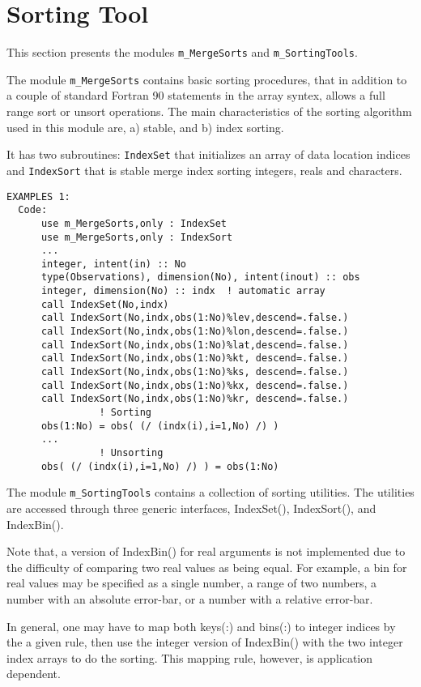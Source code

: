 \section{Sorting Tool}
%
This section presents the modules {\tt m\_MergeSorts} and
{\tt m\_SortingTools}.

\noindent
The module {\tt m\_MergeSorts} contains basic sorting procedures, that in
addition to a couple of standard Fortran 90 statements in the
array syntex, allows a full range sort or unsort operations.
The main characteristics of the sorting algorithm used in this
module are, a) stable, and b) index sorting.

It has two subroutines: {\tt IndexSet} that initializes an array of data
location indices and {\tt IndexSort} that is stable merge index sorting
integers, reals and characters.
%
\begin{verbatim}
EXAMPLES 1:
  Code:
      use m_MergeSorts,only : IndexSet
      use m_MergeSorts,only : IndexSort
      ...
      integer, intent(in) :: No
      type(Observations), dimension(No), intent(inout) :: obs
      integer, dimension(No) :: indx  ! automatic array
      call IndexSet(No,indx)
      call IndexSort(No,indx,obs(1:No)%lev,descend=.false.)
      call IndexSort(No,indx,obs(1:No)%lon,descend=.false.)
      call IndexSort(No,indx,obs(1:No)%lat,descend=.false.)
      call IndexSort(No,indx,obs(1:No)%kt, descend=.false.)
      call IndexSort(No,indx,obs(1:No)%ks, descend=.false.)
      call IndexSort(No,indx,obs(1:No)%kx, descend=.false.)
      call IndexSort(No,indx,obs(1:No)%kr, descend=.false.)
                ! Sorting
      obs(1:No) = obs( (/ (indx(i),i=1,No) /) )
      ...
                ! Unsorting
      obs( (/ (indx(i),i=1,No) /) ) = obs(1:No)
\end{verbatim}
 
\noindent
The module {\tt m\_SortingTools} contains a collection of sorting utilities.  
The utilities are accessed through three generic interfaces, IndexSet(),
IndexSort(), and IndexBin().

Note that, a version of IndexBin() for real arguments is not implemented 
due to the difficulty of comparing two real values as being equal.  
For example, a bin for real values may be specified as a single number, 
a range of two numbers, a number with an absolute error-bar, or a number 
with a relative error-bar.
 
In general, one may have to map both keys(:) and bins(:) to integer indices 
by the a given rule, then use the integer version of IndexBin() with the 
two integer index arrays to do the sorting.
This mapping rule, however, is application dependent.
 
